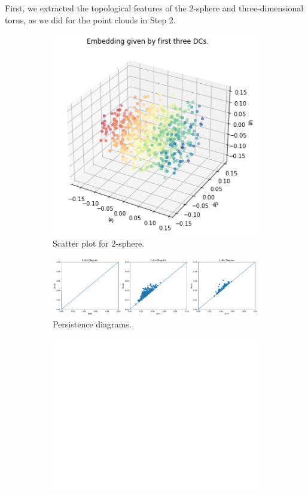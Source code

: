 First, we extracted the topological features of the $2$-sphere and three-dimensional torus, as we did for the point clouds in Step 2. 
\begin{figure}[H]
\centering
\begin{subfigure}[b]{0.2\textwidth}
    \includegraphics[width=\textwidth]{figures/dsphere.png}
    \caption{Scatter plot for $2$-sphere.}
\end{subfigure}
\hfill
\begin{subfigure}[b]{0.75\textwidth}
    \includegraphics[width=\textwidth]{figures/dsphere_Hk.png}
    \caption{Persistence diagrams.}
\end{subfigure}
\begin{subfigure}[b]{0.25\textwidth}
\includegraphics[width=\textwidth]{figures/white.png} 

\end{subfigure}
\end{figure}
